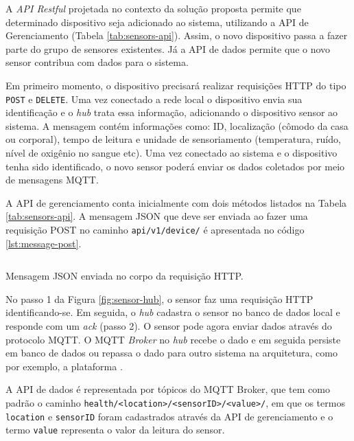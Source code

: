 A \textit{API Restful} projetada no contexto da solução proposta permite que determinado
dispositivo seja adicionado ao sistema, utilizando a API de Gerenciamento (Tabela
\ref{tab:sensors-api}). 
Assim, o novo dispositivo passa a fazer parte do grupo de sensores existentes.
Já a API de dados permite que o novo sensor contribua com dados para o sistema.


Em primeiro momento, o dispositivo precisará realizar requisições HTTP do tipo
\texttt{POST} e \texttt{DELETE}. Uma vez conectado a rede local o dispositivo envia sua
identificação e o \textit{hub} trata essa informação, adicionando o dispositivo
sensor ao sistema. A mensagem contém informações como: ID, localização (cômodo da casa
ou corporal), tempo de leitura e unidade de sensoriamento (temperatura, ruído,
nível de oxigênio no sangue etc). Uma vez conectado ao sistema e o dispositivo
tenha sido identificado, o novo sensor poderá enviar os dados coletados por meio de
mensagens MQTT. 

A API de gerenciamento conta inicialmente com dois métodos listados na Tabela
\ref{tab:sensors-api}. A mensagem JSON que deve ser enviada ao fazer uma
requisição POST no caminho \texttt{api/v1/device/} é apresentada no código
\ref{lst:message-post}.

\begin{listing}[ht!]
\inputminted{json}{codigos/message-post.json}
\caption{Mensagem JSON enviada no corpo da requisição HTTP.}
\label{lst:message-post}
\end{listing}

No passo 1 da Figura \ref{fig:sensor-hub}, o sensor faz uma requisição HTTP
identificando-se. Em seguida, o \textit{hub} cadastra o sensor no banco de dados
local e responde com um \textit{ack} (passo 2). O sensor pode agora enviar
dados através do protocolo MQTT. O MQTT \textit{Broker} no \textit{hub} recebe
o dado e em seguida persiste em banco de dados ou repassa o dado para outro
sistema na arquitetura, como por exemplo, a plataforma \nextsaude.


A API de dados é representada por tópicos do MQTT Broker, que tem como padrão
o caminho \texttt{health/<location>/<sensorID>/<value>/}, em que os termos 
\texttt{location} e \texttt{sensorID} foram cadastrados através da API de
gerenciamento e o termo \texttt{value} representa o valor da leitura do sensor.

